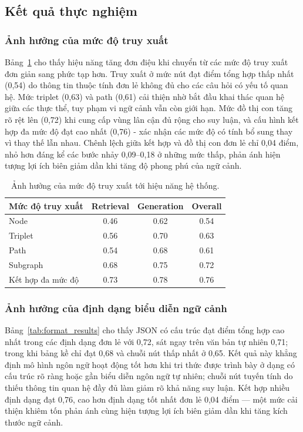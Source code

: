 \subsection{Kết quả thực nghiệm}

\subsubsection{Ảnh hưởng của mức độ truy xuất}

Bảng~\ref{tab:granularity_results} cho thấy hiệu năng tăng đơn điệu khi chuyển từ các mức độ truy xuất đơn giản sang phức tạp hơn. Truy xuất ở mức nút đạt điểm tổng hợp thấp nhất (0,54) do thông tin thuộc tính đơn lẻ không đủ cho các câu hỏi có yếu tố quan hệ. Mức triplet (0,63) và path (0,61) cải thiện nhờ bắt đầu khai thác quan hệ giữa các thực thể, tuy phạm vi ngữ cảnh vẫn còn giới hạn. Mức đồ thị con tăng rõ rệt lên (0,72) khi cung cấp vùng lân cận đủ rộng cho suy luận, và cấu hình kết hợp đa mức độ đạt cao nhất (0,76) - xác nhận các mức độ có tính bổ sung thay vì thay thế lẫn nhau. Chênh lệch giữa kết hợp và đồ thị con đơn lẻ chỉ 0,04 điểm, nhỏ hơn đáng kể các bước nhảy 0,09--0,18 ở những mức thấp, phản ánh hiện tượng lợi ích biên giảm dần khi tăng độ phong phú của ngữ cảnh.

\begin{table}[h]
\centering
\caption{Ảnh hưởng của mức độ truy xuất tới hiệu năng hệ thống.}
\label{tab:granularity_results}
\begin{tabular}{lccc}
\hline
\textbf{Mức độ truy xuất} & \textbf{Retrieval} & \textbf{Generation} & \textbf{Overall} \\
\hline
Node              & 0.46 & 0.62 & 0.54 \\
Triplet           & 0.56 & 0.70 & 0.63 \\
Path              & 0.54 & 0.68 & 0.61 \\
Subgraph          & 0.68 & 0.75 & 0.72 \\
Kết hợp đa mức độ & 0.73 & 0.78 & 0.76 \\
\hline
\end{tabular}
\end{table}

\subsubsection{Ảnh hưởng của định dạng biểu diễn ngữ cảnh}

Bảng~\ref{tab:format_results} cho thấy JSON có cấu trúc đạt điểm tổng hợp cao nhất trong các định dạng đơn lẻ với 0,72, sát ngay trên văn bản tự nhiên 0,71; trong khi bảng kề chỉ đạt 0,68 và chuỗi nút thấp nhất ở 0,65. Kết quả này khẳng định mô hình ngôn ngữ hoạt động tốt hơn khi tri thức được trình bày ở dạng có cấu trúc rõ ràng hoặc gần biểu diễn ngôn ngữ tự nhiên; chuỗi nút tuyến tính do thiếu thông tin quan hệ đầy đủ làm giảm rõ khả năng suy luận. Kết hợp nhiều định dạng đạt 0,76, cao hơn định dạng tốt nhất đơn lẻ 0,04 điểm --- một mức cải thiện khiêm tốn phản ánh cùng hiện tượng lợi ích biên giảm dần khi tăng kích thước ngữ cảnh.

